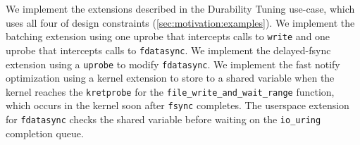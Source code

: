 We implement the extensions described in the Durability Tuning use-case, which uses all four of \sys{} design constraints (\cref{sec:motivation:examples}).  We implement the batching extension using one uprobe that intercepts calls to \texttt{write} and one uprobe that intercepts calls to \texttt{fdatasync}.  We implement the delayed-fsync extension using a \texttt{uprobe} to modify \texttt{fdatasync}.  We implement the fast notify optimization using a kernel extension to store to a shared variable when the kernel reaches the \texttt{kretprobe} for the \texttt{file\_write\_and\_wait\_range} function, which occurs in the kernel soon after \texttt{fsync} completes.  The userspace extension for \texttt{fdatasync} checks the shared variable before waiting on the \texttt{io\_uring} completion queue.   %





